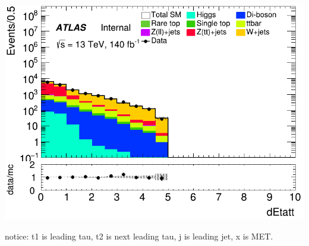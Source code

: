 \documentclass[usenames,dvipsnames]{beamer}
\begin{document}
\begin{frame}
    \begin{minipage}{0.32\textwidth}
        \centering
        \includegraphics[width=\textwidth]{graphics/HH_met/HH_met_dEtatt.png}
    \end{minipage}
    
    \vspace{0.5cm} %
    notice: t1 is leading tau, t2 is next leading tau, j is leading jet, x is MET.
\end{frame}
\end{document}
